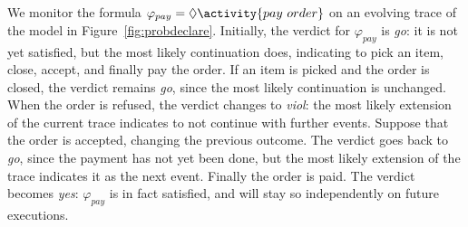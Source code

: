 \begin{example}
We monitor the formula $\varphi_{pay}=\Diamond \activity{pay\ order}$
on an evolving trace of the \pdeclare model in Figure~\ref{fig:probdeclare}.
Initially, the verdict for $\varphi_{pay}$ is \emph{go}: it is not yet satisfied, but the most likely continuation does, 
indicating to pick an item, close, accept, and finally pay the order.
If an item is picked and the order is closed, the verdict remains \emph{go}, since the most likely 
continuation is unchanged.
When the order is refused, the verdict changes to \emph{viol}: the most likely extension of the current trace 
indicates to not continue with further events.
Suppose that the order is accepted, changing the previous outcome. The verdict goes back to \emph{go}, 
since the payment has not yet been done, but the most likely extension of the trace indicates it as the next 
event.
Finally the order is paid. The verdict becomes \emph{yes}: $\varphi_{pay}$ is in fact satisfied, and will stay 
so independently on future executions.
\end{example}

  